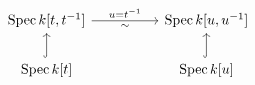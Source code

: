 \[\begin{tikzcd}[column sep=huge]
\Spec k[t,t^{-1}] \arrow[r,"u=t^{-1}","\sim"'] & \Spec k[u,u^{-1}]\\
\Spec k[t] \arrow[u,hook] & \Spec k[u] \arrow[u,hook]
\end{tikzcd}\]
